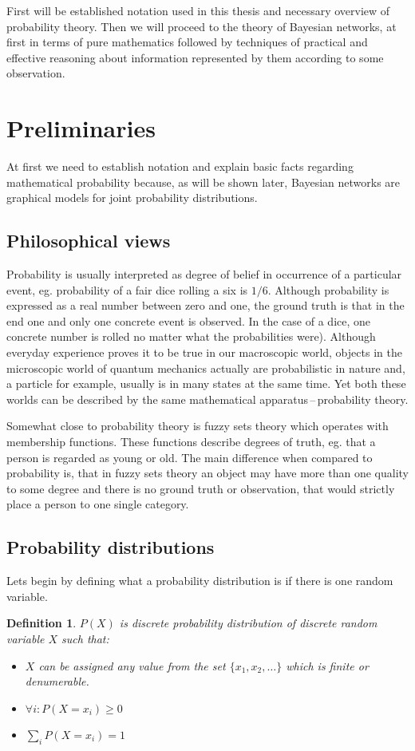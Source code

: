 \documentclass[english,cover]{fitthesis} %
\newtheorem{math_def}{Definition}[chapter] %
\newcommand{\uncertain}[1]{{\color{magenta} #1}}
\begin{document}
First will be established notation used in this thesis and necessary overview of probability theory. Then we will proceed to the theory of Bayesian networks, at first in terms of pure mathematics followed by techniques of practical and effective \uncertain{reasoning about information represented by them according to some observation.}




\section{Preliminaries}
At first we need to establish notation and explain basic facts regarding mathematical probability because, as will be shown later, Bayesian networks are graphical models for joint probability distributions.

\subsection{Philosophical views}
Probability is usually interpreted as degree of belief in occurrence of a particular event, eg. probability of a fair dice rolling a six is $1/6$. Although probability is expressed as a real number between zero and one, the ground truth is that in the end one and only one concrete event is observed. In the case of a dice, one concrete number is rolled no matter what the probabilities were). Although everyday experience proves it to be true in our macroscopic world, objects in the microscopic world of quantum mechanics actually are probabilistic in nature and, a particle for example, usually is in many states at the same time. Yet both these worlds can be described by the same mathematical apparatus\,--\,probability theory.

Somewhat close to probability theory is fuzzy sets theory which operates with membership functions. These functions describe degrees of truth, eg. that a person is regarded as young or old. The main difference when compared to probability is, that in fuzzy sets theory an object may have more than one quality to some degree and there is no ground truth or observation, that would strictly place a person to one single category.


\subsection{Probability distributions}
Lets begin by defining what a probability distribution is if there is one random variable.
\begin{math_def}\label{def_prob_distribution}
    $P(X)$ is discrete probability distribution of discrete random variable $X$ such that:
    \begin{itemize}
        \item $X$ can be assigned any value from the set $\lbrace x_1, x_2, \dots \rbrace$ which is finite or denumerable.
        \item $\forall i: P(X = x_i) \geq 0$
        \item $\sum_i P(X = x_i) = 1$
    \end{itemize}
\end{math_def}
\end{document}
